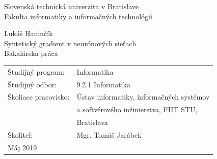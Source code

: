 \documentclass[12pt, twoside]{book}
\def\mfrok{2018}
\def\mfnazov{Syntetický gradient v neurónových sieťach}
\def\mftyp{Bakalárska práca}
\def\mfautor{Lukáš Haninčík}
\def\mfskolitel{Mgr. Tomáš Jarábek}
\def\mfkonzultant{tit. Meno Priezvisko, tit. }
\def\mfmiesto{Bratislava, \mfrok}
\def\mfodbor{9.2.1 Informatika}
\def\program{ Informatika }
\def\mfpracovisko{ Ústav informatiky, informačných systémov \\ 
& a softvérového inžinierstva, FIIT STU, \\
& Bratislava }
\begin{document}
     
\frontmatter

\thispagestyle{empty}
\noindent

\begin{center}
\large
Slovenská technická univerzita v Bratislave\\
Fakulta informatiky a informačných technológií

\vfill
Lukáš Haninčík \\
{\sc\LARGE\mfnazov}\\
\mftyp
\end{center}

\vfill

\noindent
\begin{tabular}{ll}
Študijný program: & \program \\
Študijný odbor: & \mfodbor \\
Školiace pracovisko: & \mfpracovisko \\
Školiteľ: & \mfskolitel \\
Máj 2019
\end{tabular}




\eject %




\end{document}
